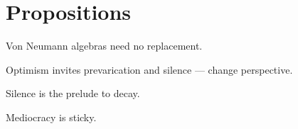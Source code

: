 \documentclass[a]{subfiles}
\begin{document}
\chapter{Propositions}
\begin{parsec}%
Von Neumann algebras
need no replacement.
\end{parsec}
\begin{parsec}%
Optimism
invites prevarication and silence
--- change perspective.
\end{parsec}
\begin{parsec}%
Silence is the prelude to decay.
\end{parsec}
\begin{parsec}%
Mediocracy is sticky.
\end{parsec}
\end{document}
